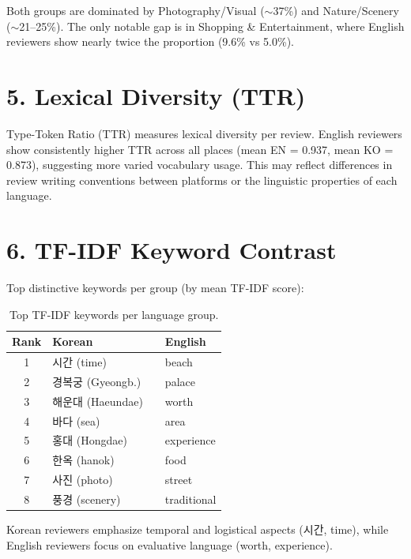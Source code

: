 \documentclass[11pt,a4paper]{article}
\begin{document}
Both groups are dominated by Photography/Visual ($\sim$37\%) and
Nature/Scenery ($\sim$21--25\%). The only notable gap is in
Shopping \& Entertainment, where English reviewers show nearly
twice the proportion (9.6\% vs 5.0\%).

\section*{5. Lexical Diversity (TTR)}

Type-Token Ratio (TTR) measures lexical diversity per review.
English reviewers show consistently higher TTR across all places
(mean EN = 0.937, mean KO = 0.873), suggesting more varied vocabulary
usage. This may reflect differences in review writing conventions
between platforms or the linguistic properties of each language.

\section*{6. TF-IDF Keyword Contrast}

Top distinctive keywords per group (by mean TF-IDF score):

\begin{table}[H]
\centering
\small
\begin{tabular}{clcl}
\toprule
\textbf{Rank} & \textbf{Korean} & & \textbf{English} \\
\midrule
1 & 시간 (time)     & & beach \\
2 & 경복궁 (Gyeongb.)& & palace \\
3 & 해운대 (Haeundae)& & worth \\
4 & 바다 (sea)      & & area \\
5 & 홍대 (Hongdae)  & & experience \\
6 & 한옥 (hanok)    & & food \\
7 & 사진 (photo)    & & street \\
8 & 풍경 (scenery)  & & traditional \\
\bottomrule
\end{tabular}
\caption{Top TF-IDF keywords per language group.}
\end{table}

Korean reviewers emphasize temporal and logistical aspects (시간, time),
while English reviewers focus on evaluative language (worth, experience).

\end{document}
